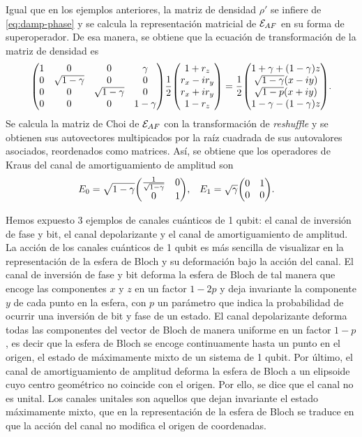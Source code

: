 Igual que en los ejemplos anteriores, la matriz de densidad $\rho'$
se infiere de \eqref{eq:damp-phase} y se calcula la representación 
matricial de $\mathcal{E}_{AF}$ en su forma de superoperador. De esa 
manera, se obtiene que la ecuación de transformación de la 
matriz de densidad es
\begin{align}
\mqty(
1 & 0 & 0 & \gamma  \\
0 & \sqrt{1-\gamma } & 0 & 0 \\
0 & 0 & \sqrt{1-\gamma } & 0 \\
0 & 0 & 0 & 1-\gamma
)
\frac{1}{2}
\mqty(
1+r_z\\r_x-ir_y\\r_x+ir_y\\1-r_z
)
=
\frac{1}{2}
\mqty(
1+\gamma+\qty(1-\gamma)z\\
\sqrt{1-\gamma}\qty(x-i y)\\
\sqrt{1-p}\qty(x+i y)\\
1-\gamma-\qty(1-\gamma)z
).
\end{align}
Se calcula la matriz de Choi de $\mathcal{E}_{AF}$ con la transformación
de \textit{reshuffle} y se obtienen sus autovectores multipicados
por la raíz cuadrada de sus autovalores asociados, reordenados
como matrices. Así, se obtiene que los operadores de Kraus 
del canal de amortiguamiento de amplitud son
\begin{align}
E_0&=
\sqrt{1-\gamma }
\mqty(
\frac{1}{\sqrt{1-\gamma }} & 0 \\
0 & 1
),&
E_1&=
\sqrt{\gamma }
\mqty(
0 & 1 \\
0 & 0 
).
\end{align}

Hemos expuesto 3 ejemplos de canales cuánticos de 1 qubit:
el canal de inversión de fase y bit, el canal depolarizante 
y el canal de amortiguamiento
de amplitud. La acción de los canales cuánticos de 1 qubit 
es más sencilla de visualizar en la representación de la esfera de Bloch
y su deformación bajo la acción del canal. 
El canal de inversión de fase y bit deforma la
esfera de Bloch de tal manera que encoge las componentes $x$ y $z$ en 
un factor $1-2p$ y deja invariante la componente
$y$ de cada punto en la esfera, con $p$ un parámetro que indica la
probabilidad de ocurrir una inversión de bit y fase de un estado. 
El canal depolarizante 
deforma todas las componentes del vector de Bloch de manera uniforme
en un factor $1-p$, es decir que la esfera de Bloch se encoge
continuamente hasta un punto en el origen, el estado
de máximamente mixto de un sistema de 1 qubit. Por último, 
el canal de amortiguamiento de amplitud deforma la esfera de Bloch
a un elipsoide cuyo centro geométrico no coincide con el origen. Por
ello, se dice que el canal no es unital. Los canales unitales son 
aquellos que dejan invariante el estado máximamente mixto, 
que en la representación de la esfera de Bloch se traduce en 
que la acción del canal no modifica el origen de coordenadas.

